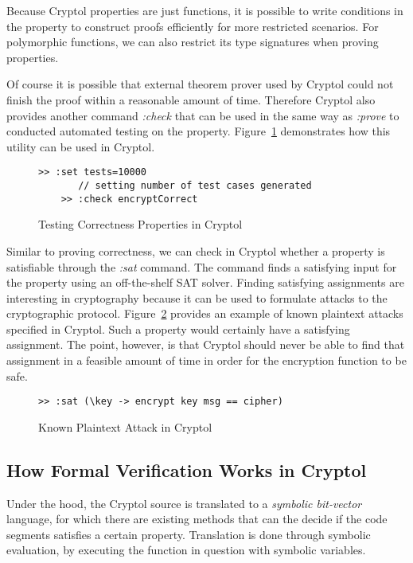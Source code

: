 \documentclass[a4paper, notitlepage]{report}
\begin{document}
Because Cryptol properties are just functions, it is possible to write conditions
in the property to construct proofs efficiently for more restricted scenarios.
For polymorphic functions, we can also restrict its type signatures when
proving properties.

Of course it is possible that external theorem prover used by Cryptol could
not finish the proof within a reasonable amount of time. Therefore Cryptol
also provides another command \emph{:check} that can be used in the same way
as \emph{:prove} to conducted automated testing on the property. Figure~\ref{fig:test}
demonstrates how this utility can be used in Cryptol.

\begin{figure}
  \begin{lstlisting}[frame=single]
    >> :set tests=10000
       // setting number of test cases generated 
    >> :check encryptCorrect
  \end{lstlisting}
  \caption{Testing Correctness Properties in Cryptol}
  \label{fig:test}
\end{figure}

Similar to proving correctness, we can check in Cryptol whether a property is
satisfiable through the \emph{:sat} command. The command finds a satisfying input
for the property using an off-the-shelf SAT solver. 
Finding satisfying assignments are interesting in cryptography because it can
be used to formulate attacks to the cryptographic protocol. Figure~\ref{fig:sat}
provides an example of known plaintext attacks specified in Cryptol.
Such a property would certainly have a satisfying assignment. The point, however,
is that Cryptol should never be able to find that assignment in a feasible amount
of time in order for the encryption function to be safe.

\begin{figure}
  \begin{lstlisting}[frame=single]
    >> :sat (\key -> encrypt key msg == cipher)
  \end{lstlisting}
  \caption{Known Plaintext Attack in Cryptol}
  \label{fig:sat}
\end{figure}

\subsection{How Formal Verification Works in Cryptol}

Under the hood, the Cryptol source is translated to a \emph{symbolic bit-vector} language,
for which there are existing methods that can the decide if the code segments satisfies
a certain property. Translation is done through symbolic evaluation,
by executing the function in question with symbolic variables.
\end{document}

